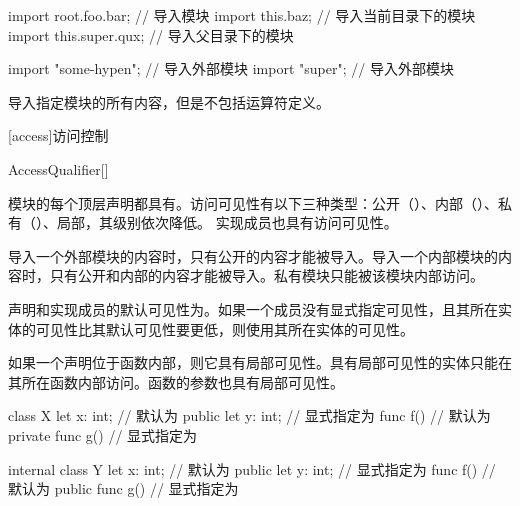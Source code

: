 \enterexample
\begin{codeblock}
import root.foo.bar; // 导入模块
import this.baz; // 导入当前目录下的模块
import this.super.qux; // 导入父目录下的模块

import "some-hypen"; // 导入外部模块
import "super"; // 导入外部模块
\end{codeblock}
\exitexample

\pnum
\tcode{*}导入指定模块的所有内容，但是不包括运算符定义。

[access]{访问控制}

\begin{bnf}{AccessQualifier}[\oneof]
\end{bnf}

\pnum
模块的每个顶层声明都具有。访问可见性有以下三种类型：公开（）、内部（）、私有（）、局部，其级别依次降低。
实现成员也具有访问可见性。

\pnum
导入一个外部模块的内容时，只有公开的内容才能被导入。导入一个内部模块的内容时，只有公开和内部的内容才能被导入。私有模块只能被该模块内部访问。

\pnum
声明和实现成员的默认可见性为。如果一个成员没有显式指定可见性，且其所在实体的可见性比其默认可见性要更低，则使用其所在实体的可见性。

\pnum
如果一个声明位于函数内部，则它具有局部可见性。具有局部可见性的实体只能在其所在函数内部访问。函数的参数也具有局部可见性。

\enterexample
\begin{codeblock}
class X {
    let x: int; // 默认为
    public let y: int; // 显式指定为
    func f() {} // 默认为
    private func g() {} // 显式指定为
}

internal class Y {
    let x: int; // 默认为
    public let y: int; // 显式指定为
    func f() {} // 默认为
    public func g() {} // 显式指定为
}
\end{codeblock}